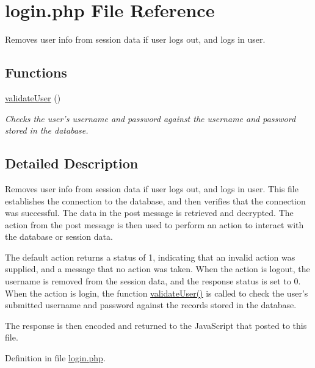 \hypertarget{login_8php}{\section{login.\-php \-File \-Reference}
\label{login_8php}
}


\-Removes user info from session data if user logs out, and logs in user.  


\subsection*{\-Functions}
\begin{DoxyCompactItemize}
\item 
\hyperlink{login_8php_a0d3d3fe80a9fe8faa3320b29dbb2c29a}{validate\-User} ()
\begin{DoxyCompactList}\small\item\em \-Checks the user's username and password against the username and password stored in the database. \end{DoxyCompactList}\end{DoxyCompactItemize}


\subsection{\-Detailed \-Description}
\-Removes user info from session data if user logs out, and logs in user. \-This file establishes the connection to the database, and then verifies that the connection was successful. \-The data in the post message is retrieved and decrypted. \-The action from the post message is then used to perform an action to interact with the database or session data.

\-The default action returns a status of 1, indicating that an invalid action was supplied, and a message that no action was taken. \-When the action is logout, the username is removed from the session data, and the response status is set to 0. \-When the action is login, the function \hyperlink{login_8php_a0d3d3fe80a9fe8faa3320b29dbb2c29a}{validate\-User()} is called to check the user's submitted username and password against the records stored in the database.

\-The response is then encoded and returned to the \-Java\-Script that posted to this file. 

\-Definition in file \hyperlink{login_8php_source}{login.\-php}.



